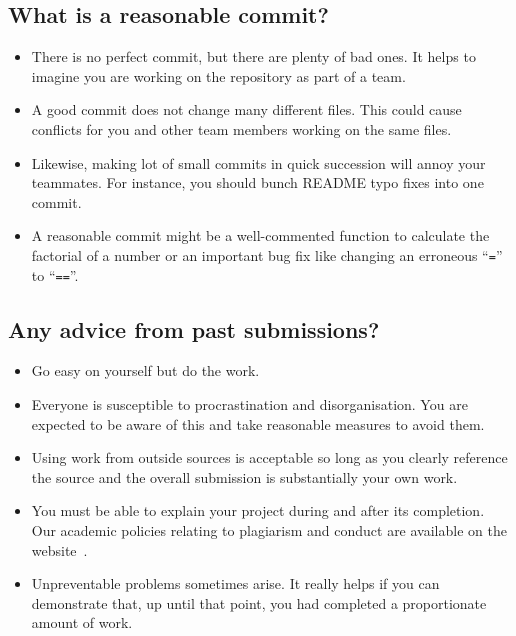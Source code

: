 \documentclass[12pt, a4paper, hidelinks]{scrartcl}
\begin{document}
  \subsection*{What is a reasonable commit?}
  \begin{itemize}
    \item There is no perfect commit, but there are plenty of bad ones. It helps to imagine you are working on the repository as part of a team.
    \item A good commit does not change many different files. This could cause conflicts for you and other team members working on the same files.
    \item Likewise, making lot of small commits in quick succession will annoy your teammates. For instance, you should bunch README typo fixes into one commit.
    \item A reasonable commit might be a well-commented function to calculate the factorial of a number or an important bug fix like changing an erroneous ``\texttt{=}'' to ``\texttt{==}''.
  \end{itemize}

  \subsection*{Any advice from past submissions?}
    \begin{itemize}
      \item Go easy on yourself but do the work.
      \item Everyone is susceptible to procrastination and disorganisation.  You are expected to be aware of this and take reasonable measures to avoid them.
      \item Using work from outside sources is acceptable so long as you clearly reference the source and the overall submission is substantially your own work.
      \item You must be able to explain your project during and after its completion. Our academic policies relating to plagiarism and conduct are available on the website~\cite{gmitqaf}. 
      \item Unpreventable problems sometimes arise. It really helps if you can demonstrate that, up until that point, you had completed a proportionate amount of work.

  \end{itemize}


  
  
\end{document}
